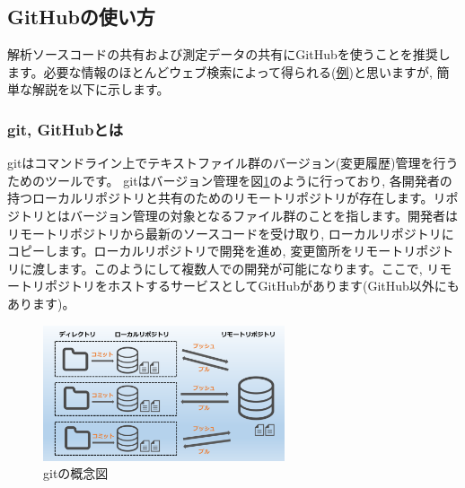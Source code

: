\subsection{GitHubの使い方}
解析ソースコードの共有および測定データの共有にGitHubを使うことを推奨します。必要な情報のほとんどウェブ検索によって得られる(\href{https://tech-blog.rakus.co.jp/entry/20200529/git}{例})と思いますが, 簡単な解説を以下に示します。

\subsubsection{git, GitHubとは}
gitはコマンドライン上でテキストファイル群のバージョン(変更履歴)管理を行うためのツールです。
gitはバージョン管理を図\ref{fig:git_desc}のように行っており, 各開発者の持つローカルリポジトリと共有のためのリモートリポジトリが存在します\cite{github}。リポジトリとはバージョン管理の対象となるファイル群のことを指します。開発者はリモートリポジトリから最新のソースコードを受け取り, ローカルリポジトリにコピーします。ローカルリポジトリで開発を進め, 変更箇所をリモートリポジトリに渡します。このようにして複数人での開発が可能になります。ここで, リモートリポジトリをホストするサービスとしてGitHubがあります(GitHub以外にもあります)。
\begin{figure}
    \centering
    \includegraphics[height=4cm]{git_desc.png}
    \caption{gitの概念図\cite{github}}
    \label{fig:git_desc}
\end{figure}

